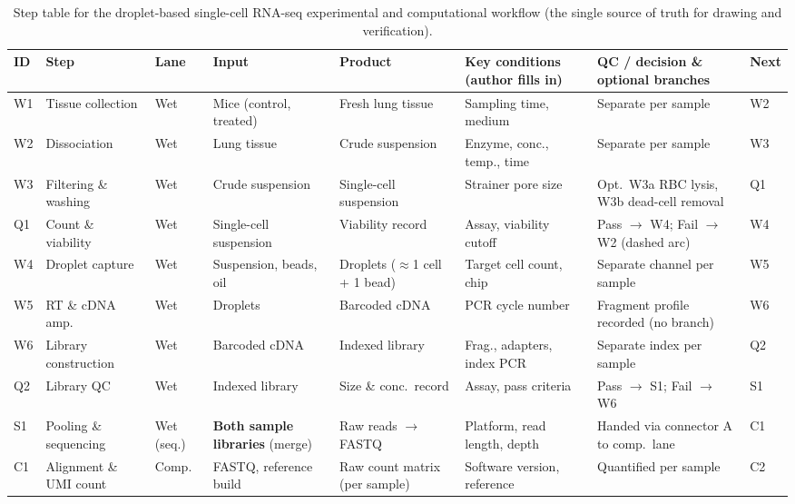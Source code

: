 \begin{table}[htbp]\centering\tiny
\setlength{\tabcolsep}{2pt}
\renewcommand{\arraystretch}{1.05}
\caption{Step table for the droplet-based single-cell RNA-seq experimental and computational workflow (the single source of truth for drawing and verification).}\label{tab:ch06-01}
\begin{tabularx}{\linewidth}{@{}l>{\raggedright\arraybackslash}p{15mm}l>{\raggedright\arraybackslash}p{16mm}>{\raggedright\arraybackslash}p{16mm}YYl@{}}
\toprule
\textbf{ID} & \textbf{Step} & \textbf{Lane} & \textbf{Input} & \textbf{Product} & \textbf{Key conditions (author fills in)} & \textbf{QC / decision \& optional branches} & \textbf{Next} \\
\midrule
W1 & Tissue collection & Wet & Mice (control, treated) & Fresh lung tissue & Sampling time, medium & Separate per sample & W2 \\
W2 & Dissociation & Wet & Lung tissue & Crude suspension & Enzyme, conc., temp., time & Separate per sample & W3 \\
W3 & Filtering \& washing & Wet & Crude suspension & Single-cell suspension & Strainer pore size & Opt.\ W3a RBC lysis, W3b dead-cell removal & Q1 \\
Q1 & Count \& viability & Wet & Single-cell suspension & Viability record & Assay, viability cutoff & Pass $\rightarrow$ W4; Fail $\rightarrow$ W2 (dashed arc) & W4 \\
W4 & Droplet capture & Wet & Suspension, beads, oil & Droplets ($\approx$1 cell + 1 bead) & Target cell count, chip & Separate channel per sample & W5 \\
W5 & RT \& cDNA amp. & Wet & Droplets & Barcoded cDNA & PCR cycle number & Fragment profile recorded (no branch) & W6 \\
W6 & Library construction & Wet & Barcoded cDNA & Indexed library & Frag., adapters, index PCR & Separate index per sample & Q2 \\
Q2 & Library QC & Wet & Indexed library & Size \& conc.\ record & Assay, pass criteria & Pass $\rightarrow$ S1; Fail $\rightarrow$ W6 & S1 \\
S1 & Pooling \& sequencing & Wet (seq.) & \textbf{Both sample libraries} (merge) & Raw reads $\rightarrow$ FASTQ & Platform, read length, depth & Handed via connector A to comp.\ lane & C1 \\
C1 & Alignment \& UMI count & Comp. & FASTQ, reference build & Raw count matrix (per sample) & Software version, reference & Quantified per sample & C2 \\

\end{tabularx}
\end{table}

